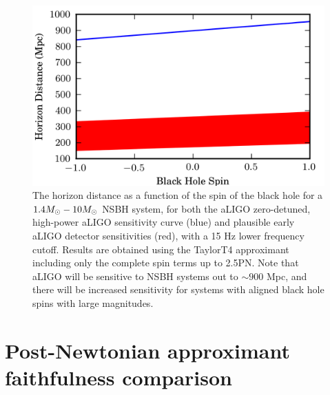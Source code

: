 \begin{figure}
\begin{center}
\includegraphics[width=1.0	\textwidth]{papers/nsbh_faithfulness/figure1.png}
\end{center}
\caption{\label{fig:t4horizon} 
The horizon distance as a function of the spin of the black hole 
for a $1.4M_\odot-10M_\odot$ \ac{NSBH} system, for both the \ac{aLIGO} zero-detuned,
high-power aLIGO sensitivity curve (blue) and plausible early \ac{aLIGO}
detector sensitivities (red), with a 15 Hz lower frequency cutoff. 
Results are obtained using the TaylorT4 approximant including only the 
complete spin terms up to 2.5\ac{PN}. Note that \ac{aLIGO} will be sensitive to
\ac{NSBH} systems out to $\sim 900$ Mpc, and there will be increased sensitivity
for systems with aligned black hole spins with large magnitudes. 
}
\end{figure}


\section{Post-Newtonian approximant faithfulness comparison}
\label{sec:faithfulness}

